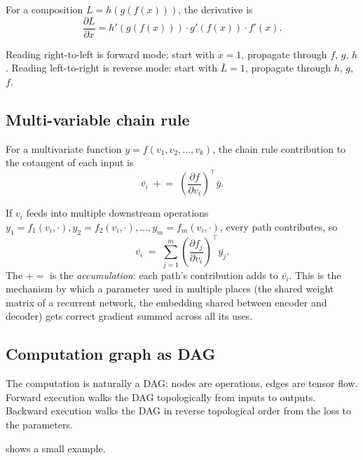 For a composition $L = h(g(f(x)))$, the derivative is
\[
\frac{\partial L}{\partial x} = h'(g(f(x))) \cdot g'(f(x)) \cdot
f'(x).
\]

Reading right-to-left is forward mode: start with $\dot{x} = 1$,
propagate through $f$, $g$, $h$. Reading left-to-right is reverse
mode: start with $\bar{L} = 1$, propagate through $h$, $g$, $f$.

\subsection{Multi-variable chain rule}
\label{ssec:ad_theory:chain_multi}

For a multivariate function $y = f(v_1, v_2, \ldots, v_k)$, the
chain rule contribution to the cotangent of each input is
\[
\bar{v_i} \;\mathrel{+}=\; \left(\frac{\partial f}{\partial
v_i}\right)^{\!\top} \bar{y}.
\]

If $v_i$ feeds into multiple downstream operations
$y_1 = f_1(v_i, \cdot), y_2 = f_2(v_i, \cdot), \ldots, y_m =
f_m(v_i, \cdot)$, every path contributes, so
\[
\bar{v_i} \;=\; \sum_{j=1}^{m} \left(\frac{\partial f_j}{\partial
v_i}\right)^{\!\top} \bar{y_j}.
\]
The $+=$ is the \emph{accumulation}: each path's contribution
adds to $\bar{v_i}$. This is the mechanism by which a parameter
used in multiple places (the shared weight matrix of a recurrent
network, the embedding shared between encoder and decoder) gets
correct gradient summed across all its uses.

\subsection{Computation graph as DAG}
\label{ssec:ad_theory:dag}

The computation is naturally a DAG: nodes are operations, edges
are tensor flow. Forward execution walks the DAG topologically
from inputs to outputs. Backward execution walks the DAG in
reverse topological order from the loss to the parameters.

 shows a small example.


